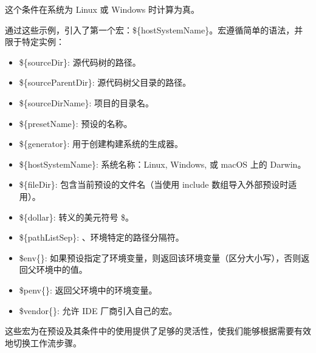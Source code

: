 这个条件在系统为 Linux 或 Windows 时计算为真。

通过这些示例，引入了第一个宏：\$\{hostSystemName\}。宏遵循简单的语法，并限于特定实例：

\begin{itemize}
\item
\$\{sourceDir\}: 源代码树的路径。

\item
\$\{sourceParentDir\}: 源代码树父目录的路径。

\item
\$\{sourceDirName\}: 项目的目录名。

\item
\$\{presetName\}: 预设的名称。

\item
\$\{generator\}: 用于创建构建系统的生成器。

\item
\$\{hostSystemName\}: 系统名称：Linux, Windows, 或 macOS 上的 Darwin。

\item
\$\{fileDir\}: 包含当前预设的文件名（当使用 include 数组导入外部预设时适用）。

\item
\$\{dollar\}: 转义的美元符号 \$。

\item
\$\{pathListSep\}: 、环境特定的路径分隔符。

\item
\$env\{<variable-name>\}: 如果预设指定了环境变量，则返回该环境变量（区分大小写），否则返回父环境中的值。

\item
\$penv\{<variable-name>\}: 返回父环境中的环境变量。

\item
\$vendor\{<macro-name>\}: 允许 IDE 厂商引入自己的宏。
\end{itemize}

这些宏为在预设及其条件中的使用提供了足够的灵活性，使我们能够根据需要有效地切换工作流步骤。


























